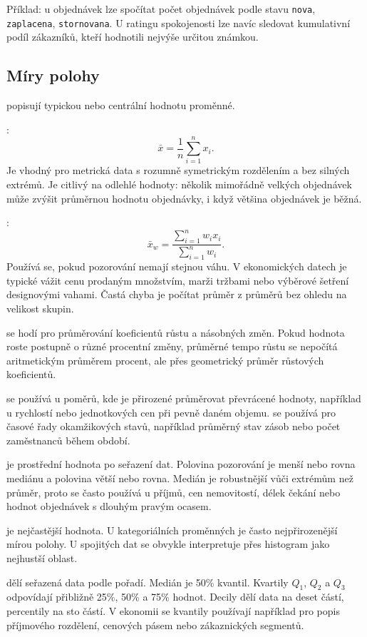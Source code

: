 Příklad: u objednávek lze spočítat počet objednávek podle stavu \texttt{nova}, \texttt{zaplacena},
\texttt{stornovana}. U ratingu spokojenosti lze navíc sledovat kumulativní podíl zákazníků, kteří
hodnotili nejvýše určitou známkou.

\subsection{Míry polohy}
 popisují typickou nebo centrální hodnotu proměnné.

:
\[
  \bar{x} = \frac{1}{n}\sum_{i=1}^{n}x_i.
\]
Je vhodný pro metrická data s rozumně symetrickým rozdělením a bez silných extrémů. Je citlivý na
odlehlé hodnoty: několik mimořádně velkých objednávek může zvýšit průměrnou hodnotu objednávky,
i když většina objednávek je běžná.

:
\[
  \bar{x}_w = \frac{\sum_{i=1}^{n} w_i x_i}{\sum_{i=1}^{n} w_i}.
\]
Používá se, pokud pozorování nemají stejnou váhu. V ekonomických datech je typické vážit cenu
prodaným množstvím, marži tržbami nebo výběrové šetření designovými vahami. Častá chyba je počítat
průměr z průměrů bez ohledu na velikost skupin.

 se hodí pro průměrování koeficientů růstu a násobných změn. Pokud hodnota
roste postupně o různé procentní změny, průměrné tempo růstu se nepočítá aritmetickým průměrem
procent, ale přes geometrický průměr růstových koeficientů.

 se používá u poměrů, kde je přirozené průměrovat převrácené hodnoty, například
u rychlostí nebo jednotkových cen při pevně daném objemu.  se používá pro
časové řady okamžikových stavů, například průměrný stav zásob nebo počet zaměstnanců během období.

 je prostřední hodnota po seřazení dat. Polovina pozorování je menší nebo rovna mediánu
a polovina větší nebo rovna. Medián je robustnější vůči extrémům než průměr, proto se často používá
u příjmů, cen nemovitostí, délek čekání nebo hodnot objednávek s dlouhým pravým ocasem.

 je nejčastější hodnota. U kategoriálních proměnných je často nejpřirozenější mírou
polohy. U spojitých dat se obvykle interpretuje přes histogram jako nejhustší oblast.

 dělí seřazená data podle pořadí. Medián je 50\% kvantil. Kvartily \(Q_1\), \(Q_2\)
a \(Q_3\) odpovídají přibližně 25\%, 50\% a 75\% hodnot. Decily dělí data na deset částí, percentily
na sto částí. V ekonomii se kvantily používají například pro popis příjmového rozdělení, cenových
pásem nebo zákaznických segmentů.

